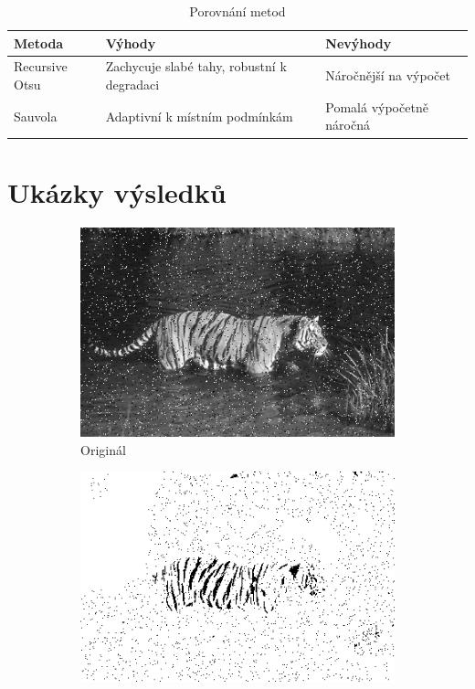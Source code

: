 \documentclass[12pt,a4paper]{article}
\begin{document}
\begin{table}[h]
\centering
\caption{Porovnání metod}
\begin{tabular}{|l|l|l|}
\hline
Metoda & Výhody & Nevýhody \\
\hline
Recursive Otsu & Zachycuje slabé tahy, robustní k degradaci & Náročnější na výpočet \\
Sauvola & Adaptivní k místním podmínkám & Pomalá výpočetně náročná \\
\hline
\end{tabular}
\end{table}

\section{Ukázky výsledků}

\begin{figure}[h!]
    \centering
    \begin{subfigure}[b]{0.3\textwidth}
        \includegraphics[width=\textwidth]{original1.png}
        \caption{Originál}
    \end{subfigure}
    \hfill
    \begin{subfigure}[b]{0.3\textwidth}
        \includegraphics[width=\textwidth]{otsu1.png}

\end{subfigure}
\end{figure}
\end{document}
